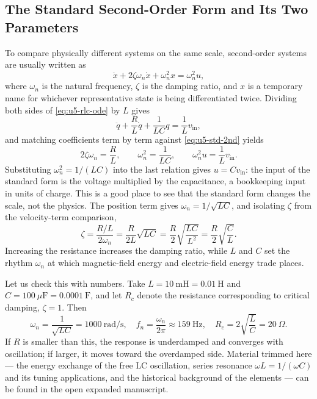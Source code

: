 \subsection{The Standard Second-Order Form and Its Two Parameters}

To compare physically different systems on the same scale, second-order
systems are usually written as
\begin{equation}
  \ddot{x} + 2\zeta\omega_n\dot{x} + \omega_n^2 x = \omega_n^2 u,
  \label{eq:u5-std-2nd}
\end{equation}
where $\omega_n$ is the natural frequency, $\zeta$ is the damping ratio,
and $x$ is a temporary name for whichever representative state is being
differentiated twice.
Dividing both sides of \eqref{eq:u5-rlc-ode} by $L$ gives
\begin{equation}
  \ddot{q} + \frac{R}{L}\dot{q} + \frac{1}{LC}q = \frac{1}{L}v_{\mathrm{in}},
\end{equation}
and matching coefficients term by term against \eqref{eq:u5-std-2nd}
yields
\begin{equation}
  2\zeta\omega_n = \frac{R}{L},
  \qquad
  \omega_n^2 = \frac{1}{LC},
  \qquad
  \omega_n^2 u = \frac{1}{L}v_{\mathrm{in}}.
\end{equation}
Substituting $\omega_n^2 = 1/(LC)$ into the last relation gives
$u = C v_{\mathrm{in}}$: the input of the standard form is the voltage
multiplied by the capacitance, a bookkeeping input in units of charge.
This is a good place to see that the standard form changes the scale, not
the physics.
The position term gives $\omega_n = 1/\sqrt{LC}$, and isolating $\zeta$
from the velocity-term comparison,
\begin{equation}
  \zeta
  = \frac{R/L}{2\omega_n}
  = \frac{R}{2L}\sqrt{LC}
  = \frac{R}{2}\sqrt{\frac{LC}{L^2}}
  = \frac{R}{2}\sqrt{\frac{C}{L}}.
\end{equation}
Increasing the resistance increases the damping ratio, while $L$ and $C$
set the rhythm $\omega_n$ at which magnetic-field energy and
electric-field energy trade places.

Let us check this with numbers.
Take $L = 10~\mathrm{mH} = 0.01~\mathrm{H}$ and
$C = 100~\mu\mathrm{F} = 0.0001~\mathrm{F}$, and let $R_c$ denote the
resistance corresponding to critical damping, $\zeta = 1$.
Then
\begin{equation}
  \omega_n = \frac{1}{\sqrt{LC}} = 1000~\mathrm{rad/s},
  \quad
  f_n = \frac{\omega_n}{2\pi} \approx 159~\mathrm{Hz},
  \quad
  R_c = 2\sqrt{\frac{L}{C}} = 20~\Omega.
\end{equation}
If $R$ is smaller than this, the response is underdamped and converges
with oscillation; if larger, it moves toward the overdamped side.
Material trimmed here --- the energy exchange of the free LC oscillation,
series resonance $\omega L = 1/(\omega C)$ and its tuning applications,
and the historical background of the elements --- can be found in the open
expanded manuscript.

